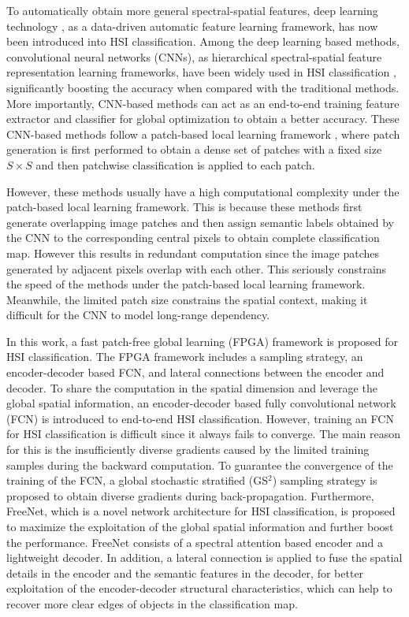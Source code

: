 \documentclass[journal]{IEEEtran}
\begin{document}
To automatically obtain more general spectral-spatial features, deep learning technology \cite{lecun2015deep}, as a data-driven automatic feature learning framework, has now been introduced into HSI classification.
Among the deep learning based methods, convolutional neural networks (CNNs), as hierarchical spectral-spatial feature representation learning frameworks, have been widely used in HSI classification \cite{yue2015spectral, hu2015deep, chen2016deep,yu2017convolutional, paoletti2018new}, significantly boosting the accuracy when compared with the traditional methods.
More importantly, CNN-based methods can act as an end-to-end training feature extractor and classifier for global optimization to obtain a better accuracy.
These CNN-based methods follow a patch-based local learning framework \cite{chen2014deep, yue2015spectral,paoletti2018new, xu2018spectral, zhu2018deformable, gong2019cnn,hang2019cascaded}, where patch generation is first performed to obtain a dense set of patches with a fixed size $S\times S$ and then patchwise classification is applied to each patch.


However, these methods usually have a high computational complexity under the patch-based local learning framework.
This is because these methods first generate overlapping image patches and then assign semantic labels obtained by the CNN to the corresponding central pixels to obtain complete classification map.
However this results in redundant computation since the image patches generated by adjacent pixels overlap with each other.
This seriously constrains the speed of the methods under the patch-based local learning framework.
Meanwhile, the limited patch size constrains the spatial context, making it difficult for the CNN to model long-range dependency.



In this work, a fast patch-free global learning (FPGA) framework is proposed for HSI classification.
The FPGA framework includes a sampling strategy, an encoder-decoder based FCN, and lateral connections between the encoder and decoder.
To share the computation in the spatial dimension and leverage the global spatial information, an encoder-decoder based fully convolutional network (FCN) is introduced to end-to-end HSI classification.
However, training an FCN for HSI classification is difficult since it always fails to converge.
The main reason for this is the insufficiently diverse gradients caused by the limited training samples during the backward computation.
To guarantee the convergence of the training of the FCN, a global stochastic stratified (GS$^2$) sampling strategy is proposed to obtain diverse gradients during back-propagation.
Furthermore, FreeNet, which is a novel network architecture for HSI classification, is proposed to maximize the exploitation of the global spatial information and further boost the performance.
FreeNet consists of a spectral attention based encoder and a lightweight decoder.
In addition, a lateral connection is applied to fuse the spatial details in the encoder and the semantic features in the decoder, for better exploitation of the encoder-decoder structural characteristics, which can help to recover more clear edges of objects in the classification map.
\end{document}
